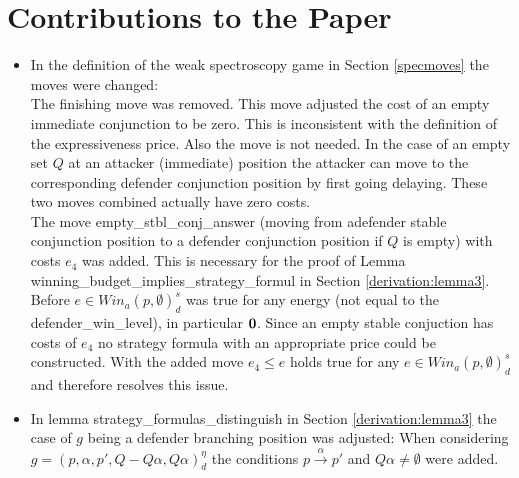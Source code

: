 \section{Contributions to the Paper}

\begin{itemize}
\item In the definition of the weak spectroscopy game in Section \ref{specmoves} the moves were changed: 
\\
The finishing move was removed. This move adjusted the cost of an empty immediate conjunction to be zero.
This is inconsistent with the definition of the expressiveness price. Also the move is not needed. In the 
case of an empty set $Q$ at an attacker (immediate) position the attacker can move to the corresponding 
defender conjunction position by first going delaying. These two moves combined actually have zero costs.
\\
The move empty\_stbl\_conj\_answer (moving from adefender stable conjunction position to a defender conjunction
position if $Q$ is empty) with costs $e_4$ was added. This is necessary for the proof of Lemma 
winning\_budget\_implies\_strategy\_formul in Section \ref{derivation:lemma3}. Before 
$e \in Win_a (p, \emptyset)_d^s $ was true for any energy (not equal to the defender\_win\_level), in particular $\bold{0}$. 
Since an empty stable conjuction has costs of $e_4$ no strategy formula with an appropriate price could be constructed. 
With the added move $e_4 \leq e $ holds true for any $e \in Win_a (p, \emptyset)_d^s $ and therefore resolves this issue.
\item In lemma strategy\_formulas\_distinguish in Section \ref{derivation:lemma3} the case of $g$ being a defender branching position was adjusted: 
When considering $g=(p,\alpha ,p', Q- Q \alpha, Q \alpha)_d^\eta$ the conditions $p \overset{\alpha}{\longrightarrow} p'$ and $Q \alpha \neq \emptyset$ were 
added. 
\end{itemize}